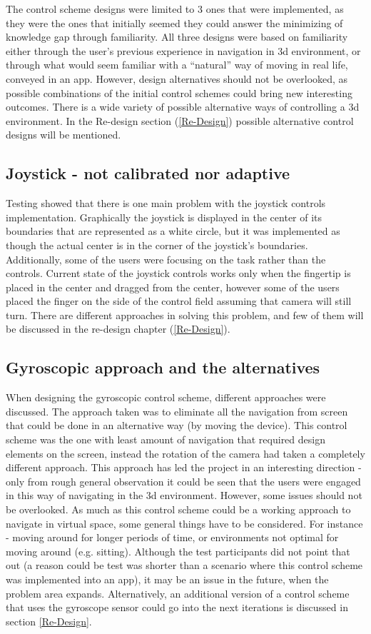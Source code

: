 The control scheme designs were limited to 3 ones that were implemented, as they were the ones that initially seemed they could answer the minimizing of knowledge gap through familiarity. All three designs were based on familiarity either through the user's previous experience in navigation in 3d environment, or through what would seem familiar with a “natural” way of moving in real life, conveyed in an app.
However, design alternatives should not be overlooked, as possible combinations of the initial control schemes could bring new interesting outcomes. There is a wide variety of possible alternative ways of controlling a 3d environment. In the Re-design section (\ref{Re-Design}) possible alternative control designs will be mentioned.


\subsection*{Joystick - not calibrated nor adaptive}
Testing showed that there is one main problem with the joystick controls implementation. Graphically the joystick is displayed in the center of its boundaries that are represented as a white circle, but it was implemented as though the actual center is in the corner of the joystick’s boundaries. Additionally, some of the users were focusing on the task rather than the controls. Current state of the joystick controls works only when the fingertip is placed in the center and dragged from the center, however some of the users placed the finger on the side of the control field assuming that camera will still turn. There are different approaches in solving this problem, and few of them will be discussed in the re-design chapter (\ref{Re-Design}). 

\subsection*{Gyroscopic approach and the alternatives}
When designing the gyroscopic control scheme, different approaches were discussed. The approach taken was to eliminate all the navigation from screen that could be done in an alternative way (by moving the device). This control scheme was the one with least amount of navigation that required design elements on the screen, instead the rotation of the camera had taken a completely different approach. This approach has led the project in an interesting direction - only from rough general observation it could be seen that the users were engaged in this way of navigating in the 3d environment.
However, some issues should not be overlooked. As much as this control scheme could be a working approach to navigate in virtual space, some general things have to be considered. For instance - moving around for longer periods of time, or environments not optimal for moving around (e.g. sitting). Although the test participants did not point that out (a reason could be test was shorter than a scenario where this control scheme was implemented into an app), it may be an issue in the future, when the problem area expands.
Alternatively, an additional version of a control scheme that uses the gyroscope sensor could go into the next iterations is discussed in section \ref{Re-Design}.



